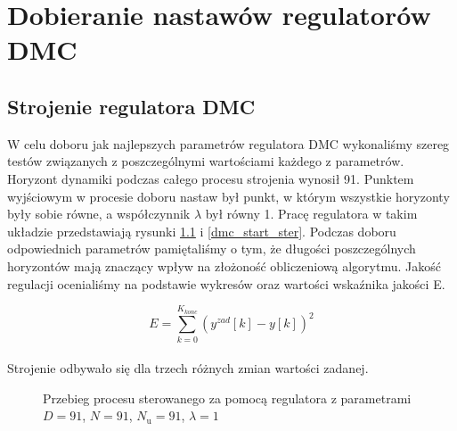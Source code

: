 \chapter{Dobieranie nastawów regulatorów DMC}
\label{dmc}

\section{Strojenie regulatora DMC}
\label{dmc_strojenie}

W celu doboru jak najlepszych parametrów regulatora DMC wykonaliśmy szereg testów związanych z poszczególnymi wartościami każdego z parametrów. Horyzont dynamiki podczas całego procesu strojenia wynosił 91. Punktem wyjściowym w procesie doboru nastaw był punkt, w którym wszystkie horyzonty były sobie równe, a współczynnik $\lambda$ był równy 1. Pracę regulatora w takim układzie przedstawiają rysunki \ref{dmc_start} i \ref{dmc_start_ster}. Podczas doboru odpowiednich parametrów pamiętaliśmy o tym, że długości poszczególnych horyzontów mają znaczący wpływ na złożoność obliczeniową algorytmu. Jakość regulacji ocenialiśmy na podstawie wykresów oraz wartości wskaźnika jakości E.

\begin{equation}
E=\sum_{k=0}^{K_{konc}}(y^{zad}[k]-y[k])^{2}
\end{equation}
\\

Strojenie odbywało się dla trzech różnych zmian wartości zadanej.
\\

\begin{figure}[b]
    \centering
    \caption{Przebieg procesu sterowanego za pomocą regulatora z parametrami $D = 91$, $N = 91$, $N_{\mathrm{u}} = 91$, $\lambda = 1$}
    \label{dmc_start}
\end{figure}

